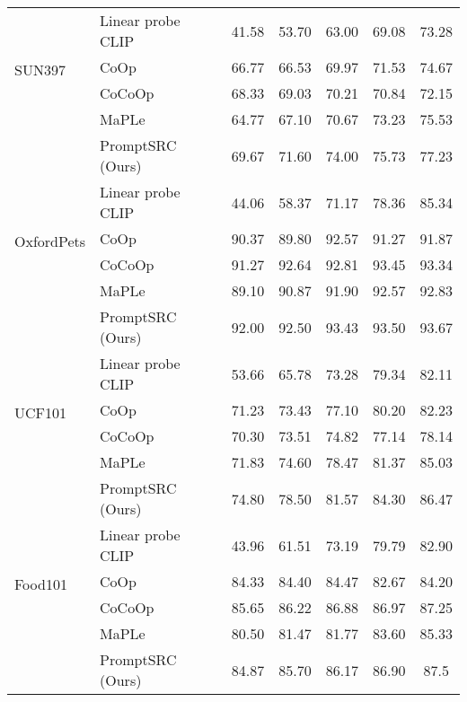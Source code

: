 \documentclass[10pt,twocolumn,letterpaper]{article}
\begin{document}
\begin{table*}[t!]
{\begin{tabular}{ll|ccccc}
                               \midrule
\multirow{4}{*}{SUN397}        & Linear probe CLIP          & 41.58	&53.70	&63.00	&69.08	&73.28\\
                               & CoOp                     & 66.77	&66.53	&69.97	&71.53	&74.67\\
                               & CoCoOp                   & 68.33	&69.03&	70.21	&70.84	&72.15\\
                                                              & MaPLe                  & 64.77	&67.10	&70.67&	73.23&	75.53\\
                             \rowcolor{tabhighlight}   &  PromptSRC (Ours)               &69.67	&71.60	&74.00	&75.73	&77.23\\
                               \midrule
\multirow{4}{*}{OxfordPets}    & Linear probe CLIP        & 44.06	&58.37	&71.17	&78.36	&85.34\\
                               & CoOp                      & 90.37	&89.80	&92.57	&91.27	&91.87\\
                               & CoCoOp                       & 91.27	&92.64	&92.81	&93.45	&93.34\\
                                                              & MaPLe                  & 89.10	&90.87	&91.90&	92.57& 92.83\\
                              \rowcolor{tabhighlight} &   PromptSRC (Ours)                  & 92.00	&92.50	&93.43	&93.50	&93.67\\
                               \midrule
\multirow{4}{*}{UCF101}        & Linear probe CLIP        & 53.66	&65.78	&73.28	&79.34&	82.11\\
                               & CoOp                     & 71.23	&73.43	&77.10	&80.20	&82.23\\
                               & CoCoOp                   & 70.30	&73.51	&74.82	&77.14&	78.14\\
                                                              & MaPLe                  & 71.83	&74.60	& 78.47& 81.37&	85.03\\
                             \rowcolor{tabhighlight}  &   PromptSRC (Ours)                  & 74.80	&78.50	&81.57	&84.30	&86.47\\
\midrule
\multirow{4}{*}{Food101}       & Linear probe CLIP       & 43.96	&61.51	&73.19	&79.79	&82.90\\
                               & CoOp                    & 84.33	&84.40	&84.47	&82.67	&84.20\\
                               & CoCoOp                     & 85.65	&86.22	&86.88	&86.97	&87.25\\
                                                              & MaPLe                  & 80.50 &81.47	&81.77&	83.60&	85.33\\
                              \rowcolor{tabhighlight} &   PromptSRC (Ours)               & 84.87&	85.70	&86.17	&86.90	&87.5\\


\end{tabular}}
\end{table*}
\end{document}

